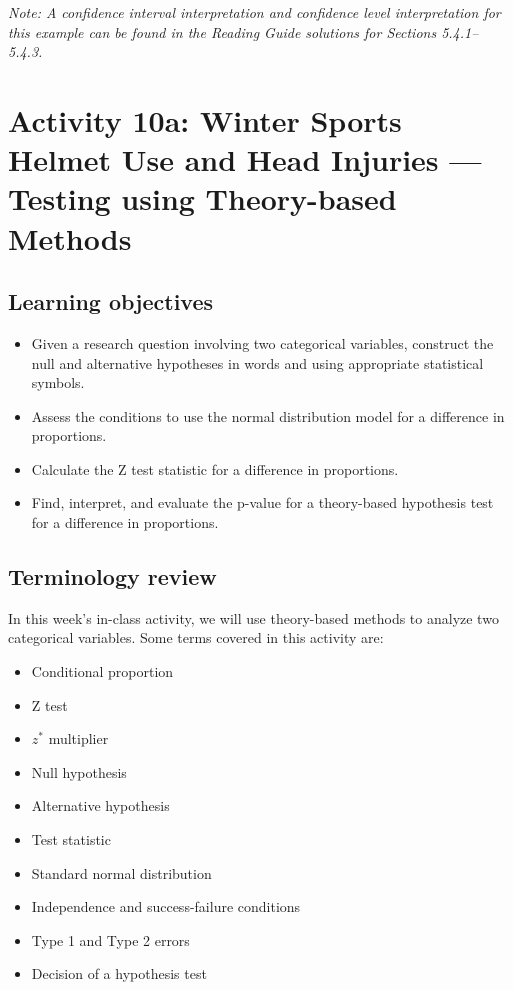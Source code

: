 \documentclass[
]{report}
\begin{document}
\emph{Note: A confidence interval interpretation and confidence level interpretation for this example can be found in the Reading Guide solutions for Sections 5.4.1--5.4.3.}

\newpage

\hypertarget{activity-10a-winter-sports-helmet-use-and-head-injuries-testing-using-theory-based-methods}{%
\section{Activity 10a: Winter Sports Helmet Use and Head Injuries --- Testing using Theory-based Methods}\label{activity-10a-winter-sports-helmet-use-and-head-injuries-testing-using-theory-based-methods}}


\hypertarget{learning-objectives-15}{%
\subsection{Learning objectives}\label{learning-objectives-15}}

\begin{itemize}
\item
  Given a research question involving two categorical variables, construct the null and alternative hypotheses
  in words and using appropriate statistical symbols.
\item
  Assess the conditions to use the normal distribution model for a difference in proportions.
\item
  Calculate the Z test statistic for a difference in proportions.
\item
  Find, interpret, and evaluate the p-value for a theory-based hypothesis test for a difference in proportions.
\end{itemize}

\hypertarget{terminology-review-17}{%
\subsection{Terminology review}\label{terminology-review-17}}

In this week's in-class activity, we will use theory-based methods to analyze two categorical variables. Some terms covered in this activity are:

\begin{itemize}
\item
  Conditional proportion
\item
  Z test
\item
  \(z^*\) multiplier
\item
  Null hypothesis
\item
  Alternative hypothesis
\item
  Test statistic
\item
  Standard normal distribution
\item
  Independence and success-failure conditions
\item
  Type 1 and Type 2 errors
\item
  Decision of a hypothesis test
\end{itemize}
\end{document}
